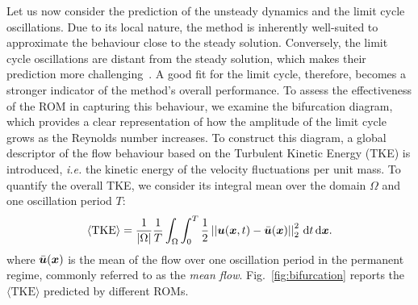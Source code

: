 \documentclass[%
reprint,
superscriptaddress,
 amsmath,amssymb,
 aps,
 pre
]{revtex4-2}
\begin{document}
Let us now consider the prediction of the unsteady dynamics and the limit cycle oscillations. Due to its local nature, the method is inherently well-suited to approximate the behaviour close to the steady solution.
Conversely, the limit cycle oscillations are distant from the steady solution, which makes their prediction more challenging~\cite{Stabile:follow}. A good fit for the limit cycle, therefore, becomes a stronger indicator of the method's overall performance. To assess the effectiveness of the ROM in capturing this behaviour, we examine the bifurcation diagram, which provides a clear representation of how the amplitude of the limit cycle grows as the Reynolds number increases.
To construct this diagram, a global descriptor of the flow behaviour based on the Turbulent Kinetic Energy (TKE) is introduced, \textit{i.e.} the kinetic energy of the velocity fluctuations per unit mass.
To quantify the overall TKE, we consider its integral mean over the domain $\Omega$ and one oscillation period $T$:
\begin{equation*}
    \langle \text{TKE} \rangle = \frac{1}{|\Omega|} \frac{1}{T} \int_{\Omega}\int_0^T \frac{1}{2}\left||{\boldsymbol{u}}({\boldsymbol{x}},t)-\bar{{\boldsymbol{u}}}({\boldsymbol{x}})|\right|_2^2 \, {\text d}t \, \text{d}{\boldsymbol{x}}.
\end{equation*}
where $\bar{{\boldsymbol{u}}}({\boldsymbol{x}})$ is the mean of the flow over one oscillation period in the permanent regime, commonly referred to as the \textit{mean flow}.
Fig.~\ref{fig:bifurcation} reports the $\langle \text{TKE} \rangle$ predicted by different ROMs.
\end{document}
